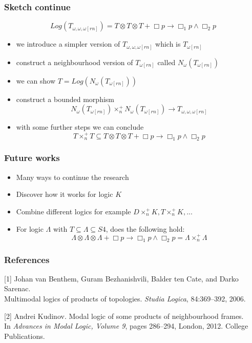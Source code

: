 \documentclass[hyperref={pdfpagelabels=false},t,10pt]{beamer}
\begin{document}
\begin{frame}
  \frametitle{Sketch continue}
  $$Log(T_{\omega,\omega,\omega[rn]}) = T \otimes T \otimes T+ \Box p \rightarrow \Box_1 p \land \Box_2 p$$
  \begin{itemize}
    \item we introduce a simpler version of $T_{\omega,\omega,\omega[rn]}$ which is $T_{\omega[rn]}$ \pause
    \item construct a neighbourhood version of $T_{\omega[rn]}$ called $N_\omega(T_{\omega[rn]})$ 
    \item we can show $T = Log(N_\omega(T_{\omega[rn]}))$ \pause
    \item construct a bounded morphism $$N_\omega(T_{\omega[rn]}) \times_n^+ N_\omega(T_{\omega[rn]}) \rightarrow T_{\omega,\omega,\omega[rn]}$$
    \item with some further steps we can conclude $$T \times_n^+ T \subseteq T \otimes T \otimes T + \Box p \rightarrow \Box_1 p \land \Box_2 p$$
  \end{itemize}

\end{frame} 


\begin{frame}
  \frametitle{Future works}
  \begin{itemize}
    \item Many ways to continue the research
    \item Discover how it works for logic $K$
    \item Combine different logics for example $D \times_n^+ K, T \times_n^+ K, ...$
    \item For logic $\Lambda$ with $T \subseteq \Lambda \subseteq S4$, does the following hold:
     $$\Lambda \otimes \Lambda \otimes \Lambda + \Box p \rightarrow \Box_1 p \land \Box_2 p = \Lambda \times_n^+ \Lambda$$
  
  \end{itemize}
\end{frame}

\begin{frame}
  \vspace{3.5cm}
  \centering
\end{frame}

\begin{frame}
  \frametitle{References}
    [1] Johan van Benthem, Guram Bezhanishvili, Balder ten Cate, and Darko Sarenac.\\
    Multimodal logics of products of topologies. \textit{Studia Logica}, 84:369–392, 2006. \newline

    [2] Andrei Kudinov. Modal logic of some products of neighbourhood frames.\\
    In \textit{Advances in Modal Logic, Volume 9}, pages 286–294, London, 2012. College Publications.
\end{frame}
\end{document}
